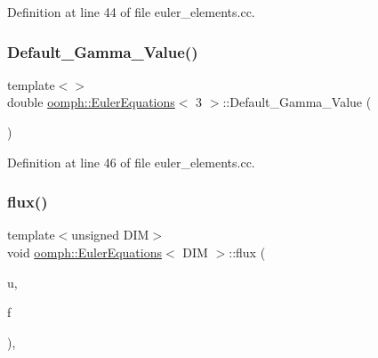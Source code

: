 Definition at line 44 of file euler\+\_\+elements.\+cc.

\mbox{\label{classoomph_1_1EulerEquations_ac2392aa486ddf2806a0243d492a0d252}} 
\subsubsection{\texorpdfstring{Default\+\_\+\+Gamma\+\_\+\+Value()}{Default\_Gamma\_Value()}\hspace{0.1cm}{\footnotesize\ttfamily [3/3]}}
{\footnotesize\ttfamily template$<$$>$ \\
double \hyperlink{classoomph_1_1EulerEquations}{oomph\+::\+Euler\+Equations}$<$ 3 $>$\+::Default\+\_\+\+Gamma\+\_\+\+Value (\begin{DoxyParamCaption}{ }\end{DoxyParamCaption})\hspace{0.3cm}{\ttfamily [private]}}



Definition at line 46 of file euler\+\_\+elements.\+cc.

\mbox{\label{classoomph_1_1EulerEquations_a2596b0523e6e40d3ece23f9fd0c6d97c}} 
\subsubsection{\texorpdfstring{flux()}{flux()}}
{\footnotesize\ttfamily template$<$unsigned D\+IM$>$ \\
void \hyperlink{classoomph_1_1EulerEquations}{oomph\+::\+Euler\+Equations}$<$ D\+IM $>$\+::flux (\begin{DoxyParamCaption}\item[{const \hyperlink{classoomph_1_1Vector}{Vector}$<$ double $>$ \&}]{u,  }\item[{\hyperlink{classoomph_1_1DenseMatrix}{Dense\+Matrix}$<$ double $>$ \&}]{f }\end{DoxyParamCaption})\hspace{0.3cm}{\ttfamily [protected]}, {\ttfamily [virtual]}}



